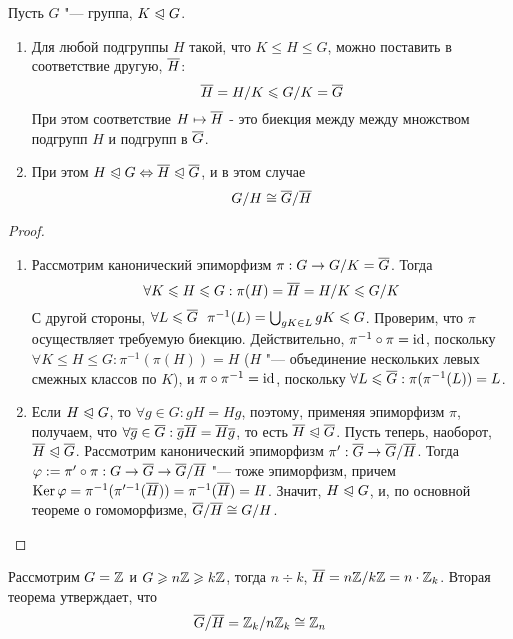 \begin{theorem}
	Пусть $G$ "--- группа, $K \trianglelefteqslant G$. 
	\begin{enumerate}
		\item Для любой подгруппы $H$ такой, что $K \le H \le G$, можно поставить в соответствие другую, $\overline{H}$:
		\[
			\overline{H} = H / K \leqslant G / K = \overline{G}
		\]
		При этом соответствие $H \mapsto \overline{H}$ - это биекция между между множством подгрупп $H$ и подгрупп в $\overline{G}$.
		
		\item При этом $H \trianglelefteqslant G \Leftrightarrow \overline{H} \trianglelefteqslant \overline{G}$, и в этом случае
		\[
			G / H \cong \overline{G} / \overline{H}
		\]
	\end{enumerate}
\end{theorem}

\begin{proof}~
	\begin{enumerate}
		\item Рассмотрим канонический эпиморфизм $\pi: G \to G / K = \overline{G}$. Тогда
		\[
			\forall K \leqslant H \leqslant G: \pi(H) =\overline{H} = H / K \leqslant G / K
		\]
		С другой стороны, $\forall L \le \ol{G}\ \ \pi^{-1}(L) = \bigcup_{gK \in L}gK \hm\le G$. Проверим, что $\pi$ осуществляет требуемую биекцию. Действительно, $\pi^{-1}\circ\pi \hm= \id$, поскольку $\forall K \le H \le G: \pi^{-1}(\pi(H)) = H$ ($H$ "--- объединение нескольких левых смежных классов по $K$), и $\pi\circ\pi^{-1} = \operatorname{id}$, поскольку $\forall L \leqslant \overline{G}: \pi(\pi^{-1}(L)) = L$.
		
		\item Если $H \trianglelefteqslant G$, то $\forall g \in G: gH = Hg$, поэтому, применяя эпиморфизм $\pi$, получаем, что $\forall \overline{g} \in \overline{G}: \overline{g}\overline{H} = \overline{H}\overline{g}$, то есть $\overline{H} \trianglelefteqslant \overline{G}$. Пусть теперь, наоборот, $\overline{H} \trianglelefteqslant \overline{G}$. Рассмотрим канонический эпиморфизм $\pi': \overline{G} \to \overline{G} / \overline{H}$. Тогда $\phi := \pi'\circ\pi: G \hm\to \ol{G} \hm\to \ol{G} / \ol{H}$ "--- тоже эпиморфизм, причем $\ke \phi = \pi^{-1}(\pi'^{-1}(\ol{H})) \hm= \pi^{-1}(\ol{H}) = H$. Значит, $H \trianglelefteqslant G$, и, по основной теореме о гомоморфизме, $\overline{G} / \overline{H} \cong G / H$.
	\end{enumerate}
\end{proof}

\begin{example}
	Рассмотрим $G = \mathbb{Z}$ и $G \geqslant n\mathbb{Z} \geqslant k\mathbb{Z}$, тогда $n \div k$, $\overline{H} = n\mathbb{Z} / k\mathbb{Z} = n \cdot \mathbb{Z}_k$. Вторая теорема утверждает, что
	\[
		\overline{G} / \overline{H} = \mathbb{Z}_k / n\mathbb{Z}_k \cong \mathbb{Z}_n
	\]
\end{example}

